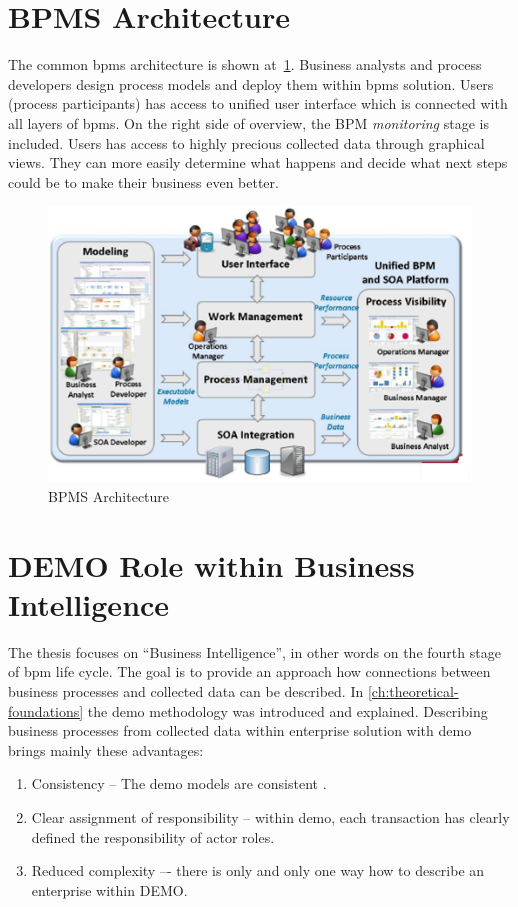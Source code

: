 \section{BPMS Architecture}
The common \gls{bpms} architecture is shown at~\cref{fig:bpms-architecture}. Business analysts and process developers design process models and deploy them within \gls{bpms} solution. Users (process participants) has access to unified user interface which is connected with all layers of \gls{bpms}. On the right side of overview, the BPM \textit{monitoring} stage is included. Users has access to highly precious collected data through graphical views. They can more easily determine what happens and decide what next steps could be to make their business even better. 

\begin{figure}[ht!]
	\centering
    \includegraphics[width=12cm]{img/tibco-bpm-architecture.png}
    \caption{BPMS Architecture \cite{tibco-bpm-2016}}
    \label{fig:bpms-architecture}
\end{figure}
\section{DEMO Role within Business Intelligence}
The thesis focuses on ``Business Intelligence'', in other words on the fourth stage of \gls{bpm} life cycle. The goal is to provide an approach how connections between business processes and collected data can be described. In \cref{ch:theoretical-foundations} the \gls{demo} methodology was introduced and explained. Describing business processes from collected data within enterprise solution with \gls{demo} brings mainly these advantages: 
\begin{enumerate}
\item Consistency -- The \gls{demo} models are consistent . 
\item Clear assignment of responsibility -- within \gls{demo}, each transaction has clearly defined the responsibility of actor roles. 
\item Reduced complexity –- there is only and only one way how to describe an enterprise within DEMO.
\end{enumerate}


